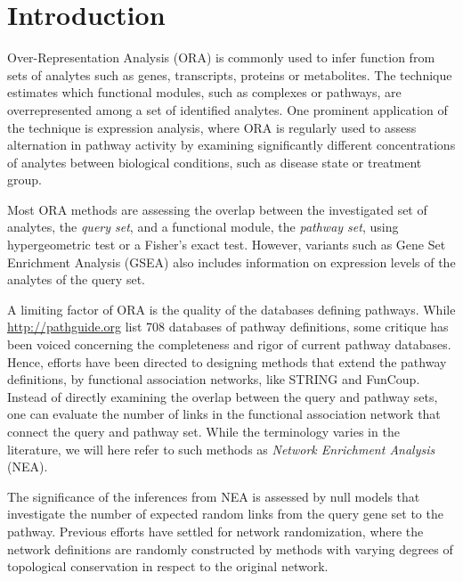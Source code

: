 \documentclass[10pt,letterpaper]{article}
\begin{document}
\section*{Introduction}

Over-Representation Analysis (ORA) is commonly used to infer function from sets of analytes such as genes, transcripts, proteins or metabolites\cite{tavazoie1999systematic,khatri2012ten,goeman2007analyzing}. The technique estimates which functional modules, such as complexes or pathways, are overrepresented among a set of identified analytes. One prominent application of the technique is expression analysis, where ORA is regularly used to assess alternation in pathway activity by examining significantly different concentrations of analytes between biological conditions, such as disease state or treatment group.

Most ORA methods are assessing the overlap between the investigated set of analytes, the {\em query set}, and a functional module, the {\em pathway set}, using hypergeometric test or a Fisher's exact test. However, variants such as Gene Set Enrichment Analysis (GSEA)\cite{subramanian2005gene} also includes information on expression levels of the analytes of the query set.

A limiting factor of ORA is the quality of the databases defining pathways. While \url{http://pathguide.org} list 708 databases of pathway definitions\cite{bader2006pathguide},  some critique has been voiced concerning the completeness and rigor of current pathway databases. Hence, efforts have been directed to designing methods that extend the pathway definitions, by functional association networks, like STRING\cite{szklarczyk2014string} and FunCoup\cite{ogris2017funcoup}. Instead of directly examining the overlap between the query and pathway sets, one can evaluate the number of links in the functional association network that connect the query and pathway set\cite{alexeyenko2012network, glaab2012enrichnet, mccormack2013statistical, ogris2016novel, signorelli2016neat}. While the terminology varies in the literature, we will here refer to such methods as {\em Network Enrichment Analysis} (NEA).

The significance of the inferences from NEA is assessed by null models that investigate the number of expected random links from the query gene set to the pathway. Previous efforts have settled for network randomization, where the network definitions are randomly constructed by methods with varying degrees of topological conservation in respect to the original network.
\end{document}
